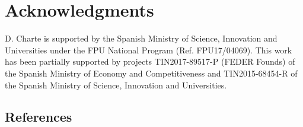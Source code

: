\documentclass[
	fontsize=11pt, %
	twoside=false, %
	open=any, %
	secnumdepth=1, %
]{kaobook}
\begin{document}


\section*{Acknowledgments}
  D. Charte is supported by the Spanish Ministry of Science, Innovation and Universities under the FPU National Program (Ref. FPU17/04069). This work has been partially supported by projects TIN2017-89517-P (FEDER Founds) of the Spanish Ministry of Economy and Competitiveness and TIN2015-68454-R of the Spanish Ministry of Science, Innovation and Universities.


\begin{widepar}
  \section*{References}
  \leavevmode
  \printbibliography[heading=none]
  \end{widepar}
  
\end{document}
